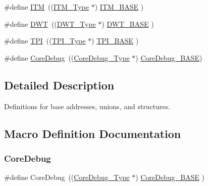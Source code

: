 \begin{DoxyCompactItemize}
\item 
\#define \mbox{\hyperlink{group___c_m_s_i_s__core__base_gabae7cdf882def602cb787bb039ff6a43}{I\+TM}}~((\mbox{\hyperlink{struct_i_t_m___type}{I\+T\+M\+\_\+\+Type}}       $\ast$)     \mbox{\hyperlink{group___c_m_s_i_s__core__base_gadd76251e412a195ec0a8f47227a8359e}{I\+T\+M\+\_\+\+B\+A\+SE}}      )
\item 
\#define \mbox{\hyperlink{group___c_m_s_i_s__core__base_gabbe5a060185e1d5afa3f85b14e10a6ce}{D\+WT}}~((\mbox{\hyperlink{struct_d_w_t___type}{D\+W\+T\+\_\+\+Type}}       $\ast$)     \mbox{\hyperlink{group___c_m_s_i_s__core__base_gafdab534f961bf8935eb456cb7700dcd2}{D\+W\+T\+\_\+\+B\+A\+SE}}      )
\item 
\#define \mbox{\hyperlink{group___c_m_s_i_s__core__base_ga8b4dd00016aed25a0ea54e9a9acd1239}{T\+PI}}~((\mbox{\hyperlink{struct_t_p_i___type}{T\+P\+I\+\_\+\+Type}}       $\ast$)     \mbox{\hyperlink{group___c_m_s_i_s__core__base_ga2b1eeff850a7e418844ca847145a1a68}{T\+P\+I\+\_\+\+B\+A\+SE}}      )
\item 
\#define \mbox{\hyperlink{group___c_m_s_i_s__core__base_gab6e30a2b802d9021619dbb0be7f5d63d}{Core\+Debug}}~((\mbox{\hyperlink{struct_core_debug___type}{Core\+Debug\+\_\+\+Type}} $\ast$)     \mbox{\hyperlink{group___c_m_s_i_s__core__base_ga680604dbcda9e9b31a1639fcffe5230b}{Core\+Debug\+\_\+\+B\+A\+SE}})
\end{DoxyCompactItemize}


\subsection{Detailed Description}
Definitions for base addresses, unions, and structures. 



\subsection{Macro Definition Documentation}
\mbox{\label{group___c_m_s_i_s__core__base_gab6e30a2b802d9021619dbb0be7f5d63d}} 
\subsubsection{\texorpdfstring{CoreDebug}{CoreDebug}\hspace{0.1cm}{\footnotesize\ttfamily [1/8]}}
{\footnotesize\ttfamily \#define Core\+Debug~((\mbox{\hyperlink{struct_core_debug___type}{Core\+Debug\+\_\+\+Type}} $\ast$)     \mbox{\hyperlink{group___c_m_s_i_s__core__base_ga680604dbcda9e9b31a1639fcffe5230b}{Core\+Debug\+\_\+\+B\+A\+SE}}   )}

